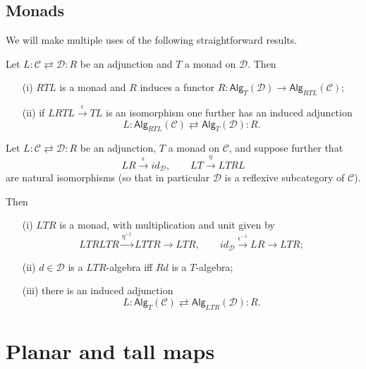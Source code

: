 \documentclass[a4paper,10pt]{article}%
\begin{document}
\subsection{Monads}

We will make multiple uses of the following straightforward results.

\begin{proposition}\label{MONADADJ1 PROP}
Let
$
L \colon \mathcal{C} \rightleftarrows \mathcal{D} \colon R
$
be an adjunction and $T$ a monad on $\mathcal{D}$.
Then
\begin{itemize}
\item[(i)] $RTL$ is a monad and $R$ induces a functor
$R \colon \mathsf{Alg}_T(\mathcal{D}) \to \mathsf{Alg}_{RTL}(\mathcal{C})$;
\item[(ii)] if $LRTL \xrightarrow{\epsilon} TL$ is an isomorphism one further has an induced adjunction
\[
L \colon \mathsf{Alg}_{RTL}(\mathcal{C})
	\rightleftarrows
\mathsf{Alg}_{T}(\mathcal{D}) \colon R.
\]
\end{itemize}
\end{proposition}



\begin{proposition}\label{MONADADJ PROP}
Let
$
L \colon \mathcal{C} \rightleftarrows \mathcal{D} \colon R
$
be an adjunction, $T$ a monad on $\mathcal{C}$, and suppose further that
\[
	LR \xrightarrow{\epsilon} id_{\mathcal{D}}, 
\qquad
	LT \xrightarrow{\eta} LTRL
\]
are natural isomorphisms 
(so that in particular $\mathcal{D}$ is a reflexive subcategory of $\mathcal{C}$).

Then
\begin{itemize}
\item[(i)] $LTR$ is a monad, with multiplication and unit given by
\[LTRLTR \xrightarrow{\eta^{-1}} LTTR \to LTR,\qquad
id_{\mathcal{D}} \xrightarrow{\epsilon^{-1}} LR \to LTR;
\]
\item[(ii)]
$d \in \mathcal{D}$ is a $LTR$-algebra iff $Rd$ is a $T$-algebra;
\item[(iii)] there is an induced adjunction
\[
L \colon \mathsf{Alg}_{T}(\mathcal{C})
	\rightleftarrows
\mathsf{Alg}_{LTR}(\mathcal{D}) \colon R.
\]
\end{itemize}
\end{proposition}









\section{Planar and tall maps}
\end{document}
